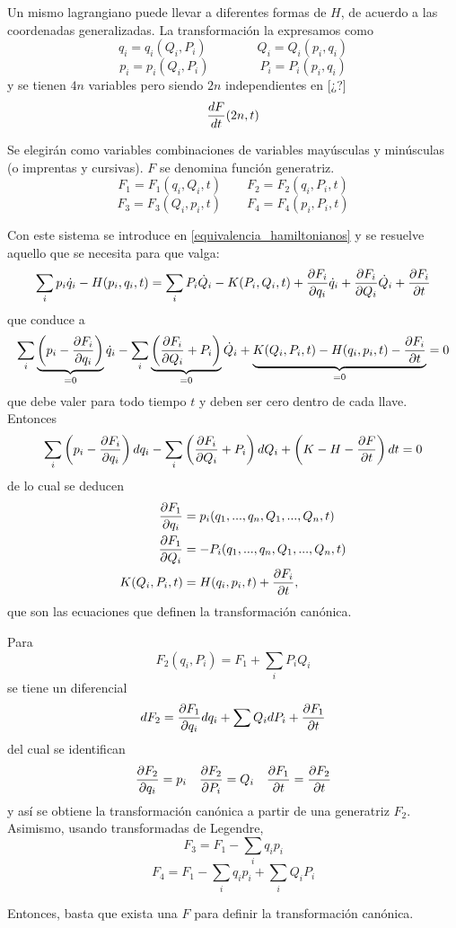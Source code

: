 \documentclass[10pt,oneside]{CBFT_book}
\begin{document}
Un mismo lagrangiano puede llevar a diferentes formas de $H$, de acuerdo a las coordenadas generalizadas.
La transformación la expresamos como
\[
	q_i = q_i(Q_i,P_i) \qquad \qquad Q_i = Q_i(p_i,q_i)
\]
\[
	p_i = p_i(Q_i,P_i) \qquad \qquad P_i = P_i(p_i,q_i)
\]
y se tienen $4n$ variables pero siendo $2n$ independientes en [¿?]
\[
	\frac{d^{\hspace{-0.05em}} {F}}{d {t}^{\hspace{-0.05em}}}(2n,t)
\]

Se elegirán como variables combinaciones de variables mayúsculas y minúsculas (o imprentas y cursivas). $F$ se denomina función 
generatriz.
\[
	F_1 = F_1(q_i,Q_i,t) \qquad F_2 = F_2(q_i,P_i,t)
\]
\[
	F_3 = F_3(Q_i,p_i,t) \qquad F_4 = F_4(p_i,P_i,t)
\]

Con este sistema se introduce en \eqref{equivalencia_hamiltonianos} y se resuelve aquello que se necesita para que valga:
\begin{multline*}
	\sum_i p_i \dot{q}_i - H(p_i,q_i,t) = \sum_i P_i\dot{Q}_i - K(P_i,Q_i,t) + \frac{\partial^{\hspace{-0.05em}} {F_i}}{\partial {q_i}^{\hspace{-0.05em}}} \dot{q}_i + 
\frac{\partial^{\hspace{-0.05em}} {F_i}}{\partial {Q_i}^{\hspace{-0.05em}}} \dot{Q}_i + \frac{\partial^{\hspace{-0.05em}} {F_i}}{\partial {t}^{\hspace{-0.05em}}} 
\end{multline*}
que conduce a 
\[
	\sum_i \underbrace{\left( p_i - \frac{\partial^{\hspace{-0.05em}} {F_i}}{\partial {q_i}^{\hspace{-0.05em}}} \right)}_{=0} \dot{q}_i  - 
	\sum_i \underbrace{\left( \frac{\partial^{\hspace{-0.05em}} {F_i}}{\partial {Q_i}^{\hspace{-0.05em}}} + P_i \right)}_{=0} \dot{Q}_i + 
	\underbrace{K( Q_i, P_i, t ) - H( q_i, p_i, t ) - \frac{\partial^{\hspace{-0.05em}} {F_i}}{\partial {t}^{\hspace{-0.05em}}}}_{=0}  = 0
\]
que debe valer para todo tiempo $t$ y deben ser cero dentro de cada llave.
Entonces
\[
	\sum_i \left( p_i - \frac{\partial^{\hspace{-0.05em}} {F_i}}{\partial {q_i}^{\hspace{-0.05em}}} \right) dq_i  - \sum_i \left( \frac{\partial^{\hspace{-0.05em}} {F_i}}{\partial {Q_i}^{\hspace{-0.05em}}} + P_i \right) dQ_i + \left( K - H - 
	\frac{\partial^{\hspace{-0.05em}} {F}}{\partial {t}^{\hspace{-0.05em}}} \right) dt = 0
\]
de lo cual se deducen
\begin{align*}
	\frac{\partial^{\hspace{-0.05em}} {F_1}}{\partial {q_i}^{\hspace{-0.05em}}} & = p_i(q_1,...,q_n,Q_1,...,Q_n,t) \\
	\frac{\partial^{\hspace{-0.05em}} {F_1}}{\partial {Q_i}^{\hspace{-0.05em}}} & = -P_i(q_1,...,q_n,Q_1,...,Q_n,t) \\
	K( Q_i, P_i, t ) & = H( q_i, p_i, t ) + \frac{\partial^{\hspace{-0.05em}} {F_i}}{\partial {t}^{\hspace{-0.05em}}},
\end{align*}
que son las ecuaciones que definen la transformación canónica.

Para 
\[
	F_2(q_i,P_i) = F_1 + \sum_i P_i Q_i
\]
se tiene un diferencial
\[
	dF_2 = \frac{\partial^{\hspace{-0.05em}} {F_1}}{\partial {q_i}^{\hspace{-0.05em}}} dq_i + \sum Q_i dP_i + \frac{\partial^{\hspace{-0.05em}} {F_1}}{\partial {t}^{\hspace{-0.05em}}}
\]
del cual se identifican
\[
	\frac{\partial^{\hspace{-0.05em}} {F_2}}{\partial {q_i}^{\hspace{-0.05em}}} = p_i \quad \frac{\partial^{\hspace{-0.05em}} {F_2}}{\partial {P_i}^{\hspace{-0.05em}}} = Q_i \quad  \frac{\partial^{\hspace{-0.05em}} {F_1}}{\partial {t}^{\hspace{-0.05em}}} = \frac{\partial^{\hspace{-0.05em}} {F_2}}{\partial {t}^{\hspace{-0.05em}}}
\]
y así se obtiene la transformación canónica a partir de una generatriz $F_2$.
Asimismo, usando transformadas de Legendre,
\[
	F_3 = F_1 - \sum_i q_i p_i
\]
\[
	F_4 = F_1 - \sum_i q_i p_i + \sum_i Q_i P_i
\]

Entonces, basta que exista una $F$ para definir la transformación canónica.











\end{document}
